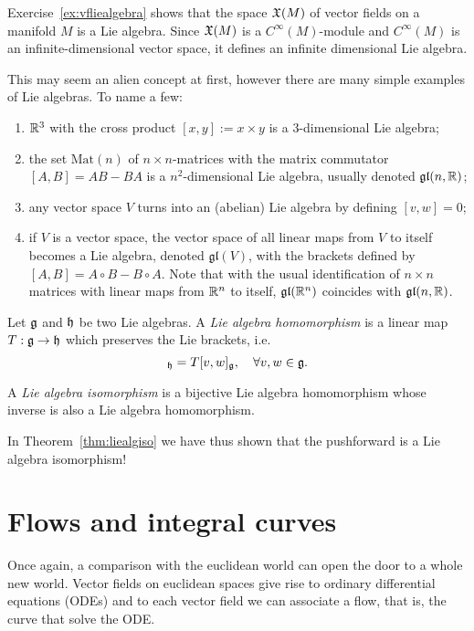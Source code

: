 \begin{example}
  Exercise~\ref{ex:vfliealgebra} shows that the space $\mathfrak{X}(M)$ of vector fields on a manifold $M$ is a Lie algebra.
  Since $\mathfrak{X}(M)$ is a $C^\infty(M)$-module and $C^\infty(M)$ is an infinite-dimensional vector space, it defines an infinite dimensional Lie algebra.

  This may seem an alien concept at first, however there are many simple examples of Lie algebras. To name a few:
  \begin{enumerate}
    \item $\mathbb{R}^3$ with the cross product $[x,y]:=x\times y$ is a $3$-dimensional Lie algebra;
    \item the set $\mathrm{Mat}(n)$ of $n\times n$-matrices with the matrix commutator $[A,B] = AB-BA$ is a $n^2$-dimensional Lie algebra, usually denoted $\mathfrak{gl}(n, \mathbb{R})$;
    \item any vector space $V$ turns into an (abelian) Lie algebra by defining $[v,w]=0$;
    \item if $V$ is a vector space, the vector space of all linear maps from $V$ to itself becomes a Lie algebra, denoted $\mathfrak{gl}(V)$, with the brackets defined by $[A,B] = A\circ B-B\circ A$. Note that with the usual identification of $n\times n$ matrices with linear maps from $\mathbb{R}^n$ to itself, $\mathfrak{gl}(\mathbb{R}^n)$ coincides with $\mathfrak{gl}(n, \mathbb{R})$.
  \end{enumerate}
\end{example}

\begin{definition}
  Let $\mathfrak{g}$ and $\mathfrak{h}$ be two Lie algebras. A \emph{Lie algebra homomorphism} is a linear map $T:\mathfrak{g}\to\mathfrak{h}$ which preserves the Lie brackets, i.e.
  \begin{equation}
    [Tv, Tw]_\fh = T[v,w]_\fg, \quad \forall v,w\in\fg.
  \end{equation}

  A \emph{Lie algebra isomorphism} is a bijective Lie algebra homomorphism whose inverse is also a Lie algebra homomorphism.
\end{definition}

In Theorem~\ref{thm:liealgiso} we have thus shown that the pushforward is a Lie algebra isomorphism!

\section{Flows and integral curves}

Once again, a comparison with the euclidean world can open the door to a whole new world.
Vector fields on euclidean spaces give rise to ordinary differential equations (ODEs) and to each vector field we can associate a flow, that is, the curve that solve the ODE.

